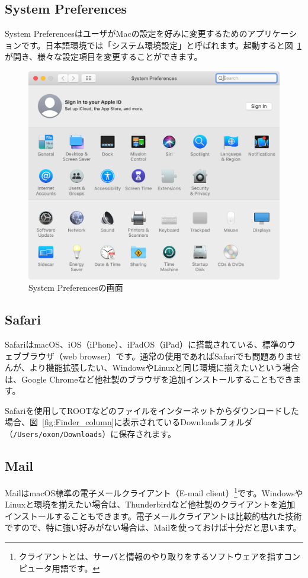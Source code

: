 \subsection{System Preferences}
System PreferencesはユーザがMacの設定を好みに変更するためのアプリケーションです。日本語環境では「システム環境設定」と呼ばれます。起動すると図~\ref{fig:SystemPreferences}が開き、様々な設定項目を変更することができます。
\begin{figure}
  \centering
  \includegraphics[scale=0.35]{fig/SystemPreferences.png}
  \caption{System Preferencesの画面}
  \label{fig:SystemPreferences}
\end{figure}

\subsection{Safari}
SafariはmacOS、iOS（iPhone）、iPadOS（iPad）に搭載されている、標準のウェブブラウザ（web browser）です。通常の使用であればSafariでも問題ありませんが、より機能拡張したい、WindowsやLinuxと同じ環境に揃えたいという場合は、Google Chromeなど他社製のブラウザを追加インストールすることもできます。

Safariを使用してROOTなどのファイルをインターネットからダウンロードした場合、図~\ref{fig:Finder_column}に表示されているDownloadsフォルダ（\texttt{/Users/oxon/Downloads}）に保存されます。
\subsection{Mail}
MailはmacOS標準の電子メールクライアント（E-mail client）\footnote{クライアントとは、サーバと情報のやり取りをするソフトウェアを指すコンピュータ用語です。}です。WindowsやLinuxと環境を揃えたい場合は、Thunderbirdなど他社製のクライアントを追加インストールすることもできます。電子メールクライアントは比較的枯れた技術ですので、特に強い好みがない場合は、Mailを使っておけば十分だと思います。

